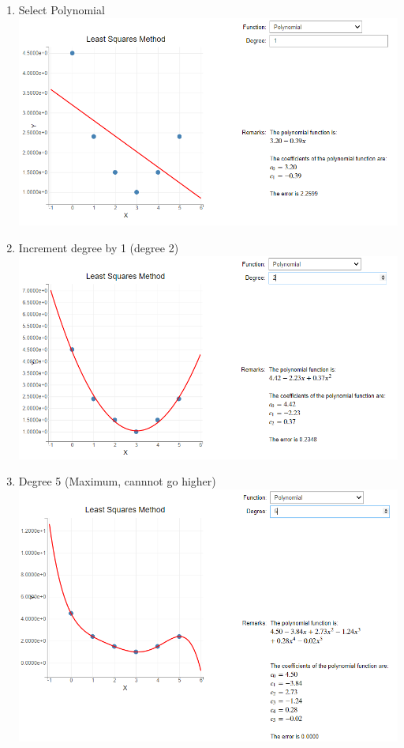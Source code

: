 {\begin{enumerate}
    \item Select Polynomial\\
    \includegraphics[scale=0.6]{Include/Images/Thesis/Documentation/Visualizers/LeastSquares/Example 1/Example 1 - 00 - Polinomial .png}
    \item Increment degree by 1 (degree 2)\\
    \includegraphics[scale=0.6]{Include/Images/Thesis/Documentation/Visualizers/LeastSquares/Example 1/Example 1 - 01 - Polinomial Degree 2.png}
    \item Degree 5 (Maximum, cannnot go higher)\\
    \includegraphics[scale=0.6]{Include/Images/Thesis/Documentation/Visualizers/LeastSquares/Example 1/Example 1 - 02 - Polinomial Degree 5.png}

\end{enumerate}
}

